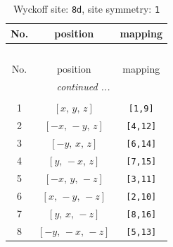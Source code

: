 \documentclass[fleqn,8pt]{jsarticle}
\begin{document}
\renewcommand{\arraystretch}{1.2}
\begin{longtable}{ccc}
\caption{Wyckoff site: {\tt 8d}, site symmetry: {\tt 1}}
 \\
 \hline \hline
No. & position & mapping \\ \hline \endfirsthead

\multicolumn{2}{l}{\tablename\ \thetable{}} \\
 \hline \hline
No. & position & mapping \\ \hline \endhead

 \hline \hline
\multicolumn{2}{r}{\footnotesize\it continued ...} \\ \endfoot

 \hline \hline
\multicolumn{2}{r}{} \\ \endlastfoot

1 & $\left[ x,\, y,\, z \right]$ & {\tt [1,9]} \\ \hline
2 & $\left[ - x,\, - y,\, z \right]$ & {\tt [4,12]} \\ \hline
3 & $\left[ - y,\, x,\, z \right]$ & {\tt [6,14]} \\ \hline
4 & $\left[ y,\, - x,\, z \right]$ & {\tt [7,15]} \\ \hline
5 & $\left[ - x,\, y,\, - z \right]$ & {\tt [3,11]} \\ \hline
6 & $\left[ x,\, - y,\, - z \right]$ & {\tt [2,10]} \\ \hline
7 & $\left[ y,\, x,\, - z \right]$ & {\tt [8,16]} \\ \hline
8 & $\left[ - y,\, - x,\, - z \right]$ & {\tt [5,13]} \\
\end{longtable}
\end{document}

